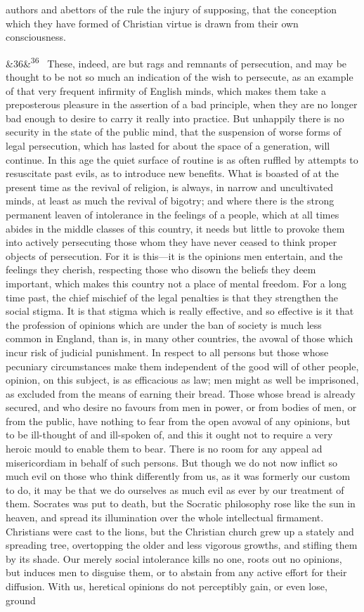 \documentclass[12pt]{article}
\newcommand{\para}[1][]{\par\noindent\ifx&#1&\else\textsuperscript{\footnotesize #1}~\fi}
\begin{document}
authors and abettors of the rule the injury of supposing, that the conception which they have formed of Christian virtue is drawn from their own consciousness.

\para[36] These, indeed, are but rags and remnants of persecution, and may be thought to be not so much an indication of the wish to persecute, as an example of that very frequent infirmity of English minds, which makes them take a preposterous pleasure in the assertion of a bad principle, when they are no longer bad enough to desire to carry it really into practice. But unhappily there is no security in the state of the public mind, that the suspension of worse forms of legal persecution, which has lasted for about the space of a generation, will continue. In this age the quiet surface of routine is as often ruffled by attempts to resuscitate past evils, as to introduce new benefits. What is boasted of at the present time as the revival of religion, is always, in narrow and uncultivated minds, at least as much the revival of bigotry; and where there is the strong permanent leaven of intolerance in the feelings of a people, which at all times abides in the middle classes of this country, it needs but little to provoke them into actively persecuting those whom they have never ceased to think proper objects of persecution. For it is this---it is the opinions men entertain, and the feelings they cherish, respecting those who disown the beliefs they deem important, which makes this country not a place of mental freedom. For a long time past, the chief mischief of the legal penalties is that they strengthen the social stigma. It is that stigma which is really effective, and so effective is it that the profession of opinions which are under the ban of society is much less common in England, than is, in many other countries, the avowal of those which incur risk of judicial punishment. In respect to all persons but those whose pecuniary circumstances make them independent of the good will of other people, opinion, on this subject, is as efficacious as law; men might as well be imprisoned, as excluded from the means of earning their bread. Those whose bread is already secured, and who desire no favours from men in power, or from bodies of men, or from the public, have nothing to fear from the open avowal of any opinions, but to be ill-thought of and ill-spoken of, and this it ought not to require a very heroic mould to enable them to bear. There is no room for any appeal ad misericordiam in behalf of such persons. But though we do not now inflict so much evil on those who think differently from us, as it was formerly our custom to do, it may be that we do ourselves as much evil as ever by our treatment of them. Socrates was put to death, but the Socratic philosophy rose like the sun in heaven, and spread its illumination over the whole intellectual firmament. Christians were cast to the lions, but the Christian church grew up a stately and spreading tree, overtopping the older and less vigorous growths, and stifling them by its shade. Our merely social intolerance kills no one, roots out no opinions, but induces men to disguise them, or to abstain from any active effort for their diffusion. With us, heretical opinions do not perceptibly gain, or even lose, ground 
\end{document}
